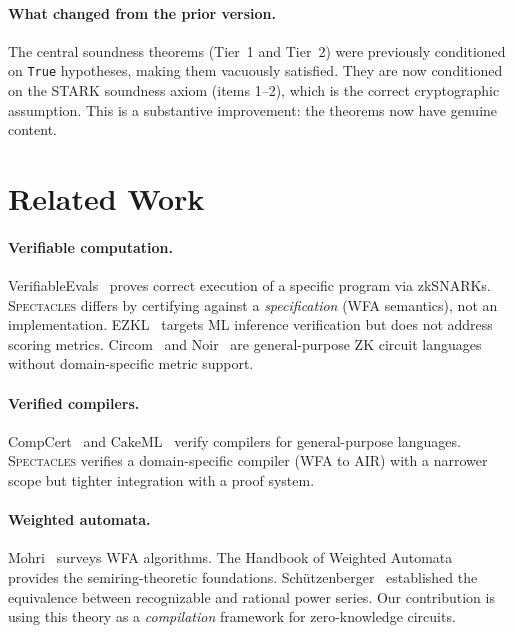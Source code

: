 \documentclass[11pt]{article}
\newcommand{\spectacles}{\textsc{Spectacles}}
\begin{document}
\paragraph{What changed from the prior version.}
The central soundness theorems (Tier~1 and Tier~2) were previously
conditioned on \texttt{True} hypotheses, making them vacuously
satisfied.
They are now conditioned on the STARK soundness axiom (items 1--2),
which is the correct cryptographic assumption.
This is a substantive improvement: the theorems now have genuine
content.


\section{Related Work}\label{sec:related}

\paragraph{Verifiable computation.}
VerifiableEvals~\cite{south2024verifiableevals} proves correct
execution of a specific program via zkSNARKs.
\spectacles{} differs by certifying against a \emph{specification}
(WFA semantics), not an implementation.
EZKL~\cite{kang2024ezkl} targets ML inference verification but
does not address scoring metrics.
Circom~\cite{belles2022circom} and Noir~\cite{noir2023} are
general-purpose ZK circuit languages without domain-specific
metric support.

\paragraph{Verified compilers.}
CompCert~\cite{leroy2009compcert} and CakeML~\cite{kumar2014cakeml}
verify compilers for general-purpose languages.
\spectacles{} verifies a domain-specific compiler (WFA to AIR)
with a narrower scope but tighter integration with a proof system.

\paragraph{Weighted automata.}
Mohri~\cite{mohri2009weighted} surveys WFA algorithms.
The Handbook of Weighted Automata~\cite{droste2009handbook} provides
the semiring-theoretic foundations.
Sch\"utzenberger~\cite{schutzenberger1961} established the
equivalence between recognizable and rational power series.
Our contribution is using this theory as a \emph{compilation}
framework for zero-knowledge circuits.
\end{document}
